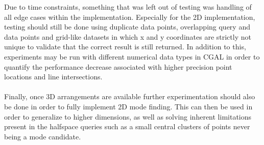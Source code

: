 \documentclass{article}
\begin{document}
{    Due to time constraints, something that was left out of testing was handling of all edge cases within the implementation. Especially for the 2D implementation, testing should still be done using duplicate data points, overlapping query and data points and grid-like datasets in which x and y coordinates are strictly not unique to validate that the correct result is still returned. In addition to this, experiments may be run with different numerical data types in CGAL in order to quantify the performance decrease associated with higher precision point locations and line intersections. \\\\
    Finally, once 3D arrangements are available further experimentation should also be done in order to fully implement 2D mode finding. This can then be used in order to generalize to higher dimensions, as well as solving inherent limitations present in the halfspace queries such as a small central clusters of points never being a mode candidate. \\\\
}
    
\printbibliography
\end{document}
